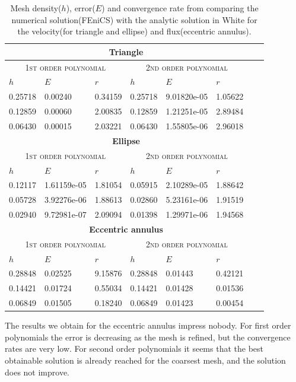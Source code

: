 \documentclass[11pt,a4paper,english]{article}
\numberwithin{equation}{section}
\begin{document}
\begin{table}[H]
\centering
\caption{Mesh density($h$), error($E$) and convergence rate from comparing the numerical solution(FEniCS) with the analytic solution in White for the velocity(for triangle and ellipse) and flux(eccentric annulus). }
\vspace{3mm}
\begin{tabular}{|l|l|l|l|l|l|l|l|}
\hline
 \multicolumn{6}{|c|}{\textbf{Triangle}}   \\
\hline
 \multicolumn{3}{|c|}{ \textsc{1st order polynomial}} &  \multicolumn{3}{|c|}{\textsc{2nd order polynomial}}  \\
\hline
$h$ & $E$ & $r$ & $h$ & $E$ & $r$   \\
\hline
0.25718 & 0.00240 & 0.34159	& 0.25718 & 9.01820e-05 & 1.05622 \\
0.12859 & 0.00060 & 2.00835	& 0.12859 & 1.21251e-05 & 2.89484 \\
0.06430 & 0.00015 & 2.03221 & 0.06430 & 1.55805e-06 & 2.96018	\\ 
\hline
 \multicolumn{6}{|c|}{\textbf{Ellipse}}   \\
\hline
 \multicolumn{3}{|c|}{ \textsc{1st order polynomial}} &  \multicolumn{3}{|c|}{\textsc{2nd order polynomial}}  \\
\hline
$h$ & $E$ & $r$ & $h$ & $E$ & $r$   \\
\hline
0.12117 & 1.61159e-05 & 1.81054 & 0.05915 & 2.10289e-05 & 1.88642 \\
0.05728 & 3.92276e-06 & 1.88613 & 0.02860 & 5.23161e-06 & 1.91519 \\
0.02940 & 9.72981e-07 & 2.09094 & 0.01398 & 1.29971e-06 & 1.94568 \\
\hline
 \multicolumn{6}{|c|}{\textbf{Eccentric annulus}}   \\
\hline
 \multicolumn{3}{|c|}{ \textsc{1st order polynomial}} &  \multicolumn{3}{|c|}{\textsc{2nd order polynomial}}  \\
\hline
$h$ & $E$ & $r$ & $h$ & $E$ & $r$   \\
\hline
0.28848 & 0.02525 & 9.15876 & 0.28848 & 0.01443 & 0.42121 \\
0.14421 & 0.01724 & 0.55034 & 0.14421 & 0.01428 & 0.01536 \\
0.06849 & 0.01505 & 0.18240 & 0.06849 & 0.01423 & 0.00454 \\
\hline
\end{tabular}
\label{tab:time}
\end{table}

The results we obtain for the eccentric annulus impress nobody. For first order polynomials the error is decreasing as the mesh is refined, but the convergence rates are very low. For second order polynomials it seems that the best obtainable solution is already reached for the coarsest mesh, and the solution does not improve. 
\end{document}
